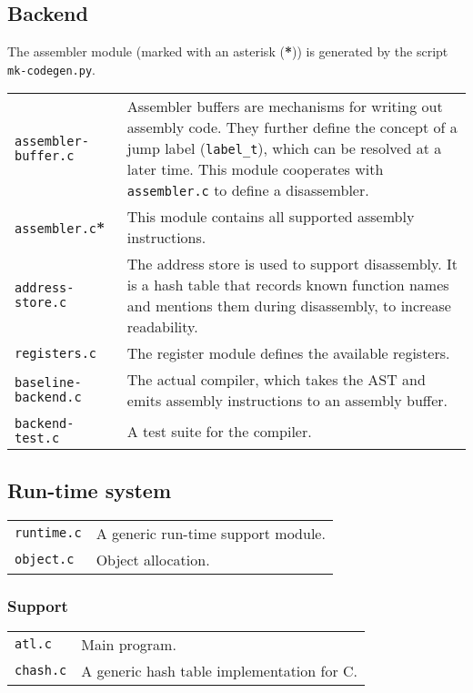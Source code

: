 \documentclass[11pt,a4paper]{article}
\newcommand{\Cty}[1]{\textcolor{dblue}{\texttt{#1}}}
\begin{document}
\subsection{Backend}

The assembler module (marked with an asterisk (\textbf{*})) is generated by the script \texttt{mk-codegen.py}.

\begin{tabular}{p{4cm}p{12cm}}
\texttt{assembler-buffer.c} & Assembler buffers are mechanisms for writing out assembly code.  They further define the concept of a jump label (\Cty{label\_t}), which can be resolved at a later time.
This module cooperates with \texttt{assembler.c} to define a disassembler. \\
\texttt{assembler.c}\textbf{*} & This module contains all supported assembly instructions. \\
\texttt{address-store.c} & The address store is used to support disassembly.  It is a hash table that records known function names and mentions them during disassembly, to increase readability. \\
\texttt{registers.c} & The register module defines the available registers.  \\
\texttt{baseline-backend.c} & The actual compiler, which takes the AST and emits assembly instructions to an assembly buffer. \\
\texttt{backend-test.c} & A test suite for the compiler. \\
\end{tabular}

\subsection{Run-time system}
\begin{tabular}{p{4cm}p{12cm}}
\texttt{runtime.c} & A generic run-time support module. \\
\texttt{object.c} & Object allocation. \\
\end{tabular}

\subsubsection{Support}

\begin{tabular}{p{4cm}p{12cm}}
\texttt{atl.c} & Main program. \\
\texttt{chash.c} & A generic hash table implementation for C. \\
\end{tabular}
\end{document}
